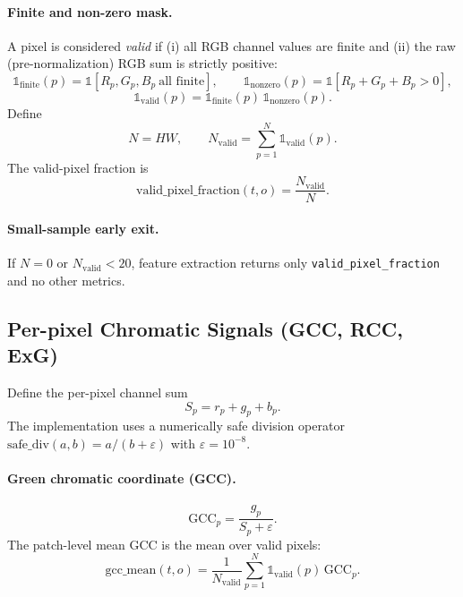 \documentclass{article}
\begin{document}
\paragraph{Finite and non-zero mask.}
A pixel is considered \emph{valid} if (i) all RGB channel values are finite and (ii) the raw (pre-normalization) RGB sum is strictly positive:
\begin{equation}
\mathbb{1}_{\mathrm{finite}}(p) = \mathbb{1}[R_p, G_p, B_p\ \text{all finite}],\qquad
\mathbb{1}_{\mathrm{nonzero}}(p) = \mathbb{1}[R_p+G_p+B_p>0],
\end{equation}
\begin{equation}
\mathbb{1}_{\mathrm{valid}}(p)=\mathbb{1}_{\mathrm{finite}}(p)\,\mathbb{1}_{\mathrm{nonzero}}(p).
\end{equation}
Define
\begin{equation}
N = HW,\qquad N_{\mathrm{valid}}=\sum_{p=1}^{N} \mathbb{1}_{\mathrm{valid}}(p).
\end{equation}
The valid-pixel fraction is
\begin{equation}
\mathrm{valid\_pixel\_fraction}(t,o)=\frac{N_{\mathrm{valid}}}{N}.
\end{equation}

\paragraph{Small-sample early exit.}
If $N=0$ or $N_{\mathrm{valid}}<20$, feature extraction returns only \texttt{valid\_pixel\_fraction} and no other metrics.

\subsection{Per-pixel Chromatic Signals (GCC, RCC, ExG)}

Define the per-pixel channel sum
\begin{equation}
S_p = r_p+g_p+b_p.
\end{equation}
The implementation uses a numerically safe division operator
$\mathrm{safe\_div}(a,b)=a/(b+\varepsilon)$ with $\varepsilon=10^{-8}$.

\paragraph{Green chromatic coordinate (GCC).}
\begin{equation}
\mathrm{GCC}_p = \frac{g_p}{S_p+\varepsilon}.
\end{equation}
The patch-level mean GCC is the mean over valid pixels:
\begin{equation}
\mathrm{gcc\_mean}(t,o) = \frac{1}{N_{\mathrm{valid}}}\sum_{p=1}^{N} \mathbb{1}_{\mathrm{valid}}(p)\,\mathrm{GCC}_p.
\end{equation}
\end{document}
